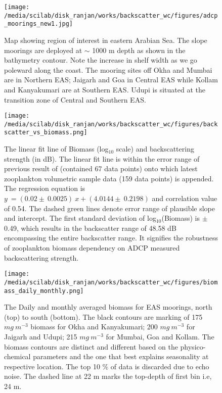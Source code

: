 \documentclass{article}
\begin{document}
\newpage
\begin{figure}[htbp]
	\centering
	\texttt{[image: /media/scilab/disk\_ranjan/works/backscatter\_wc/figures/adcp\_moorings\_new1.jpg]} 
	\captionsetup{justification=justified,font=footnotesize,skip=0.05\baselineskip,width=0.8\textwidth}
	\caption{Map showing region of interest in eastern Arabian Sea. The slope moorings are
		deployed at $\sim$ 1000 m depth as shown in the bathymetry contour. Note the increase in shelf width as we go poleward along the coast. The mooring sites off Okha and Mumbai are in Northern EAS; Jaigarh and Goa in Central EAS while Kollam and Kanyakumari are at Southern EAS. Udupi is situated at the transition zone of Central and Southern EAS.}
	\label{fig:map}
\end{figure}

\newpage
\begin{figure}[htbp]
	\centering
	\texttt{[image: /media/scilab/disk\_ranjan/works/backscatter\_wc/figures/backscatter\_vs\_biomass.png]} 
	\captionsetup{justification=justified,font=footnotesize,skip=0.05\baselineskip,width=0.8\textwidth}
	\caption{The linear fit line of Biomass (log$_10$ scale) and backscattering strength (in dB). The linear fit line is within the error range of previous result of \citep{aparna2022seasonal} (contained 67 data points) onto which latest zooplankton volumetric sample data (159 data points) is appended. The regression equation is $y\ = (0.02 \pm\ 0.0025) \ x + (4.0144 \pm \ 0.2198) $ and correlation value of 0.54. The dashed green lines denote error range of plausible slope and intercept. The first standard deviation of log$_{10}$(Biomass) is $\pm$ 0.49, which results in the backscatter range of 48.58 dB encompassing the entire backscatter range. It signifies the robustness of zooplankton biomass dependency on ADCP measured backscattering strength.}
	\label{fig:bstobm}
\end{figure}


\newpage

\begin{figure}[htbp]
	\centering
	\texttt{[image: /media/scilab/disk\_ranjan/works/backscatter\_wc/figures/biomass\_daily\_monthly.png]} 
	\captionsetup{justification=justified,font=footnotesize,skip=0.05\baselineskip,width=\textwidth}
	\caption{The Daily and monthly averaged biomass for EAS moorings, north (top) to south (bottom). The black contours are marking of 175 $mg\ m^{-3}$ biomass for Okha and Kanyakumari; 200 $mg\ m^{-3}$ for Jaigarh and Udupi; 215 $mg\ m^{-3}$  for Mumbai, Goa and Kollam. The biomass contours are distinct and different based on the physico-chemical parameters and the one that best explains seasonality at respective location.  The top 10 \% of data is discarded due to echo noise. The dashed line at 22 m marks the top-depth of first bin i.e, 24 m.}
	\label{fig:dailynmonthly}
\end{figure}
\end{document}
